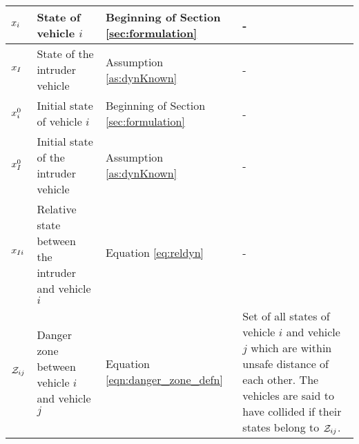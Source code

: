 \begin{table*}
{\begin{tabular}{ |>{\centering\arraybackslash}m{1.5cm}| m{5cm} | m{3cm} | m{\columnwidth} |}
    $x_i$ & State of vehicle $i$ & Beginning of Section \ref{sec:formulation} & - \\ \hline
    $x_{I}$ & State of the intruder vehicle & Assumption \ref{as:dynKnown} & - \\ \hline
    $x_i^0$ & Initial state of vehicle $i$ & Beginning of Section \ref{sec:formulation} & - \\ \hline
    $x_{I}^0$ & Initial state of the intruder vehicle & Assumption \ref{as:dynKnown} & - \\ \hline
    $x_{I i}$ & Relative state between the intruder and vehicle $i$ & Equation \eqref{eq:reldyn} & - \\ \hline
    
    $\mathcal{Z}_{ij}$ & Danger zone between vehicle $i$ and vehicle $j$ & Equation \eqref{eqn:danger_zone_defn} & Set of all states of vehicle $i$ and vehicle $j$ which are within unsafe distance of each other. The vehicles are said to have collided if their states belong to $\mathcal{Z}_{ij}$. \\ \hline
    \end{tabular} }
    \label{table:notation}
\end{table*}

